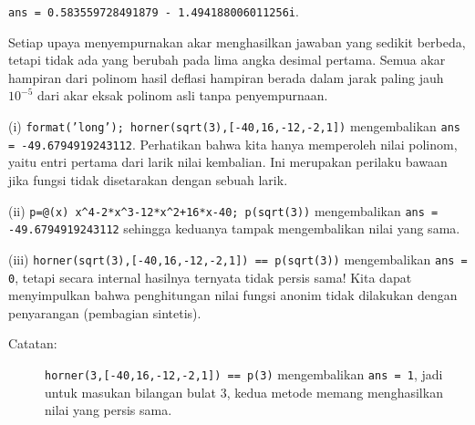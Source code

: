 \begin{description}
\texttt{ans = 0.583559728491879 - 1.494188006011256i}.

Setiap upaya menyempurnakan akar menghasilkan jawaban yang sedikit
berbeda, tetapi tidak ada yang berubah pada lima angka desimal pertama.
Semua akar hampiran dari polinom hasil deflasi hampiran berada dalam
jarak paling jauh $10^{-5}$ dari akar eksak polinom asli tanpa penyempurnaan.
\item [{\ref{exc:polynomials-8}:}] (i) \texttt{format('long'); horner(sqrt(3),{[}-40,16,-12,-2,1{]})}
mengembalikan \texttt{ans = -49.6794919243112}. Perhatikan bahwa kita
hanya memperoleh nilai polinom, yaitu entri pertama dari larik nilai
kembalian. Ini merupakan perilaku bawaan jika fungsi tidak disetarakan
dengan sebuah larik.

(ii) \texttt{p=@(x) x\textasciicircum 4-2{*}x\textasciicircum 3-12{*}x\textasciicircum 2+16{*}x-40;
p(sqrt(3))} mengembalikan \texttt{ans = -49.6794919243112} sehingga
keduanya tampak mengembalikan nilai yang sama.

(iii) \texttt{horner(sqrt(3),{[}-40,16,-12,-2,1{]}) == p(sqrt(3))}
mengembalikan \texttt{ans = 0}, tetapi secara internal hasilnya ternyata
tidak persis sama! Kita dapat menyimpulkan bahwa penghitungan nilai
fungsi anonim tidak dilakukan dengan penyarangan (pembagian sintetis).
\begin{description}
\item [{Catatan:}] \texttt{horner(3,{[}-40,16,-12,-2,1{]}) == p(3)} mengembalikan
\texttt{ans = 1}, jadi untuk masukan bilangan bulat 3, kedua metode
memang menghasilkan nilai yang persis sama.
\end{description}
\end{description}

